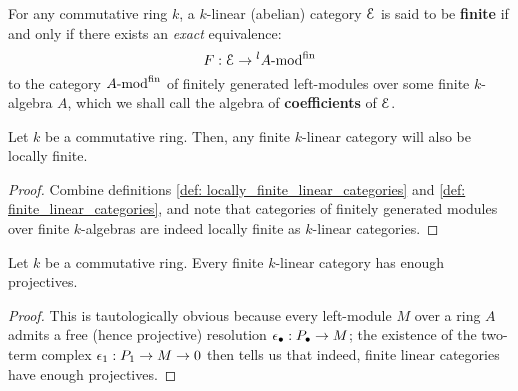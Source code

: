             \begin{definition} \label{def: finite_linear_categories}
                For any commutative ring $k$, a $k$-linear (abelian) category $\mathcal{E}$ is said to be \textbf{finite} if and only if there exists an \textit{exact} equivalence:
                    $$F: \mathcal{E} \to {}^lA\text{-}\mathrm{mod}^{\mathrm{fin}}$$
                to the category $A\text{-}\mathrm{mod}^{\mathrm{fin}}$ of finitely generated left-modules over some finite $k$-algebra $A$, which we shall call the algebra of \textbf{coefficients} of $\mathcal{E}$.
            \end{definition}
            \begin{proposition} \label{prop: finite_linear_categories_are_locally_finite}
                Let $k$ be a commutative ring. Then, any finite $k$-linear category will also be locally finite. 
            \end{proposition}
                \begin{proof}
                    Combine definitions \ref{def: locally_finite_linear_categories} and \ref{def: finite_linear_categories}, and note that categories of finitely generated modules over finite $k$-algebras are indeed locally finite as $k$-linear categories. 
                \end{proof}
            \begin{proposition} \label{prop: finite_linear_categories_have_enough_projectives}
                Let $k$ be a commutative ring. Every finite $k$-linear category has enough projectives.
            \end{proposition}
                \begin{proof}
                    This is tautologically obvious because every left-module $M$ over a ring $A$ admits a free (hence projective) resolution $\epsilon_{\bullet}: P_{\bullet} \to M$; the existence of the two-term complex $\epsilon_1: P_1 \to M \to 0$ then tells us that indeed, finite linear categories have enough projectives. 
                \end{proof}
            
